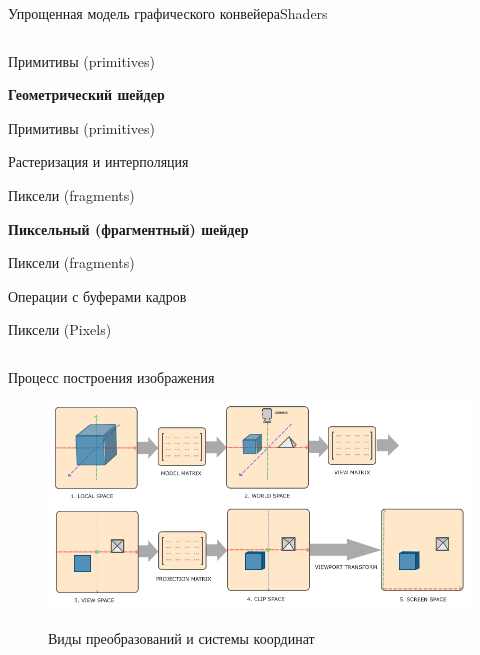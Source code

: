 \documentclass{beamer}
\begin{document}
\begin{frame}{Упрощенная модель графического конвейера}{Shaders}
\begin{columns}
\begin{column}{0.5\textwidth}
{				{\hfill Примитивы (primitives)}
				
				\textbf{Геометрический шейдер}
				
				{\hfill Примитивы (primitives)}
				
				Растеризация и интерполяция
				
				{\hfill Пиксели (fragments)}
				
				\textbf{Пиксельный (фрагментный) шейдер}
				
				{\hfill Пиксели (fragments)}
				
				Операции с буферами кадров
				
				{\hfill Пиксели (Pixels)}
			}
			\end{column}
		\end{columns}
	\end{frame}
	
	\begin{frame}{Процесс построения изображения}
		\begin{figure} 
			\href{https://learnopengl.com/Getting-started/Coordinate-Systems}{
				\includegraphics[width=\textwidth]{images/coordinate_systems.png}}
			\caption{Виды преобразований и системы координат}
		\end{figure}
		
	\end{frame}
\end{document}
